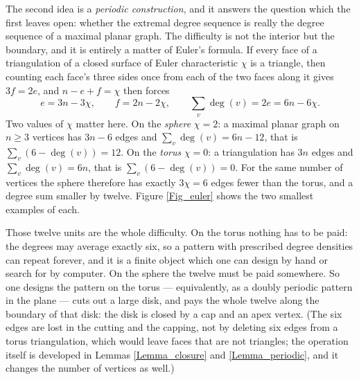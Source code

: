 \documentclass[10pt,a4paper]{article}
\begin{document}
The second idea is a \emph{periodic construction}, and it answers the question which the first leaves
open: whether the extremal degree sequence is really the degree sequence of a maximal planar graph. The
difficulty is not the interior but the boundary, and it is entirely a matter of Euler's formula. If
every face of a triangulation of a closed surface of Euler characteristic $\chi $ is a triangle, then
counting each face's three sides once from each of the two faces along it gives $3f=2e$, and $n-e+f=\chi $
then forces
\[
e=3n-3\chi ,\qquad f=2n-2\chi ,\qquad \sum_{v}\deg (v)=2e=6n-6\chi .
\]
Two values of $\chi $ matter here. On the \emph{sphere} $\chi =2$: a maximal planar graph on $n\geq 3$
vertices has $3n-6$ edges and $\sum_{v}\deg (v)=6n-12$, that is $\sum_{v}(6-\deg (v))=12$. On the
\emph{torus} $\chi =0$: a triangulation has $3n$ edges and $\sum_{v}\deg (v)=6n$, that is
$\sum_{v}(6-\deg (v))=0$. For the same number of vertices the sphere therefore has exactly
$3\chi =6$ edges fewer than the torus, and a degree sum smaller by twelve. Figure \ref{Fig_euler} shows the
two smallest examples of each.

Those twelve units are the whole difficulty. On the torus nothing has to be paid: the degrees may average
exactly six, so a pattern with prescribed degree densities can repeat forever, and it is a finite object
which one can design by hand or search for by computer. On the sphere the twelve must be paid somewhere. So
one designs the pattern on the torus --- equivalently, as a doubly periodic pattern in the plane --- cuts out
a large disk, and pays the whole twelve along the boundary of that disk: the disk is closed by a cap and an
apex vertex. (The six edges are lost in the cutting and the capping, not by deleting six edges from a torus
triangulation, which would leave faces that are not triangles; the operation itself is developed in Lemmas
\ref{Lemma_closure} and \ref{Lemma_periodic}, and it changes the number of vertices as well.) 
\end{document}
